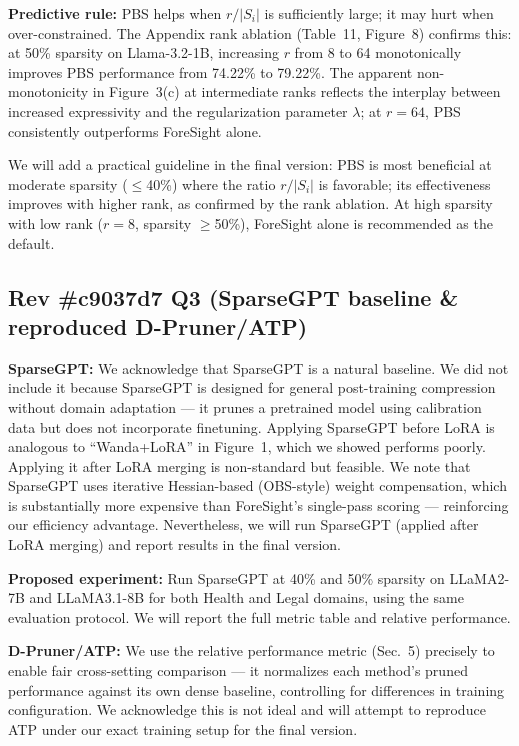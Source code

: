 \documentclass{article}
\begin{document}
\textbf{Predictive rule:} PBS helps when $r / |S_i|$ is sufficiently large; it may hurt when over-constrained. The Appendix rank ablation (Table~11, Figure~8) confirms this: at 50\% sparsity on Llama-3.2-1B, increasing $r$ from 8 to 64 monotonically improves PBS performance from 74.22\% to 79.22\%. The apparent non-monotonicity in Figure~3(c) at intermediate ranks reflects the interplay between increased expressivity and the regularization parameter $\lambda$; at $r=64$, PBS consistently outperforms ForeSight alone.

We will add a practical guideline in the final version: PBS is most beneficial at moderate sparsity ($\leq$40\%) where the ratio $r / |S_i|$ is favorable; its effectiveness improves with higher rank, as confirmed by the rank ablation. At high sparsity with low rank ($r=8$, sparsity $\geq$50\%), ForeSight alone is recommended as the default.

\subsection*{Rev \#c9037d7 Q3 (SparseGPT baseline \& reproduced D-Pruner/ATP)}

\textbf{SparseGPT:} We acknowledge that SparseGPT is a natural baseline. We did not include it because SparseGPT is designed for general post-training compression without domain adaptation --- it prunes a pretrained model using calibration data but does not incorporate finetuning. Applying SparseGPT before LoRA is analogous to ``Wanda+LoRA'' in Figure~1, which we showed performs poorly. Applying it after LoRA merging is non-standard but feasible. We note that SparseGPT uses iterative Hessian-based (OBS-style) weight compensation, which is substantially more expensive than ForeSight's single-pass scoring --- reinforcing our efficiency advantage. Nevertheless, we will run SparseGPT (applied after LoRA merging) and report results in the final version.

\textbf{Proposed experiment:} Run SparseGPT at 40\% and 50\% sparsity on LLaMA2-7B and LLaMA3.1-8B for both Health and Legal domains, using the same evaluation protocol. We will report the full metric table and relative performance.

\textbf{D-Pruner/ATP:} We use the relative performance metric (Sec.~5) precisely to enable fair cross-setting comparison --- it normalizes each method's pruned performance against its own dense baseline, controlling for differences in training configuration. We acknowledge this is not ideal and will attempt to reproduce ATP under our exact training setup for the final version.
\end{document}
